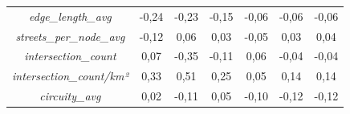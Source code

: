 \begin{spacing}{1}
\begin{table}[htb]
{\begin{tabular}{|c|ccc|ccc|}
    \textit{edge\_length\_avg} & \cellcolor[HTML]{C48358}-0,24 & \cellcolor[HTML]{C68259}-0,23 & \cellcolor[HTML]{D9785D}-0,15 & \cellcolor[HTML]{EF6D61}-0,06 & \cellcolor[HTML]{F06D61}-0,06 & \cellcolor[HTML]{F06D61}-0,06 \\
    \textit{streets\_per\_node\_avg} & \cellcolor[HTML]{E0755E}-0,12 & \cellcolor[HTML]{EF6D62}0,06 & \cellcolor[HTML]{F76964}0,03 & \cellcolor[HTML]{F16C62}-0,05 & \cellcolor[HTML]{F66964}0,03 & \cellcolor[HTML]{F56A63}0,04 \\
    \textit{intersection\_count} & \cellcolor[HTML]{EC6E61}0,07 & \cellcolor[HTML]{A89152}-0,35 & \cellcolor[HTML]{E4735F}-0,11 & \cellcolor[HTML]{F06C62}0,06 & \cellcolor[HTML]{F56A63}-0,04 & \cellcolor[HTML]{F46B62}-0,04 \\
    \textit{intersection\_count/km²} & \cellcolor[HTML]{A49252}0,33 & \cellcolor[HTML]{71AC48}0,51 & \cellcolor[HTML]{BA8857}0,25 & \cellcolor[HTML]{F16C63}0,05 & \cellcolor[HTML]{DA785E}0,14 & \cellcolor[HTML]{D9785D}0,14 \\
    \textit{circuity\_avg} & \cellcolor[HTML]{F96864}0,02 & \cellcolor[HTML]{E2745F}-0,11 & \cellcolor[HTML]{F06C62}0,05 & \cellcolor[HTML]{E6725F}-0,10 & \cellcolor[HTML]{E1745E}-0,12 & \cellcolor[HTML]{E1745E}-0,12 \\ \hline

\end{tabular}}
\end{table}
\end{spacing}
